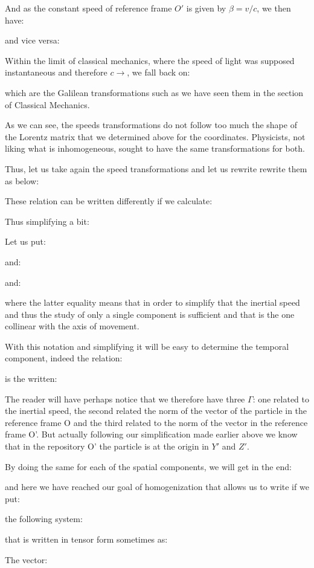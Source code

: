 	And as the constant speed of reference frame $O'$ is given by $\beta=v/c$, we then have:
	
	and vice versa:
	
	Within the limit of classical mechanics, where the speed of light was supposed instantaneous and therefore $c\rightarrow$, we fall back on:
	
	which are the Galilean transformations such as we have seen them in the section of Classical Mechanics.

	As we can see, the speeds transformations do not follow too much the shape of the Lorentz matrix that we determined above for the coordinates. Physicists, not liking what is inhomogeneous, sought to have the same transformations for both.

	Thus, let us take again the speed transformations and let us rewrite rewrite them as below:
	
	These relation can be written differently if we calculate:
	
	Thus simplifying a bit:
	
	Let us put:
	
	and:
	
	and:
	
	where the latter equality means that in order to simplify that the inertial speed and thus the study of only a single component is sufficient and that is the one collinear with the axis of movement.

	With this notation and simplifying it will be easy to determine the temporal component, indeed the relation:
	
	is the written:
	
	The reader will have perhaps notice that we therefore have three $\Gamma$: one related to the inertial speed, the second related the norm of the vector of the particle in the reference frame O and the third related to the norm of the vector in the reference frame O'. But actually following our simplification made earlier above we know that in the repository O' the particle is at the origin in $Y'$ and $Z'$.

	By doing the same for each of the spatial components, we will get in the end:
	
	and here we have reached our goal of homogenization that allows us to write if we put:
	
	the following system:
	
	that is written in tensor form  sometimes as:
	
	The vector:
	
